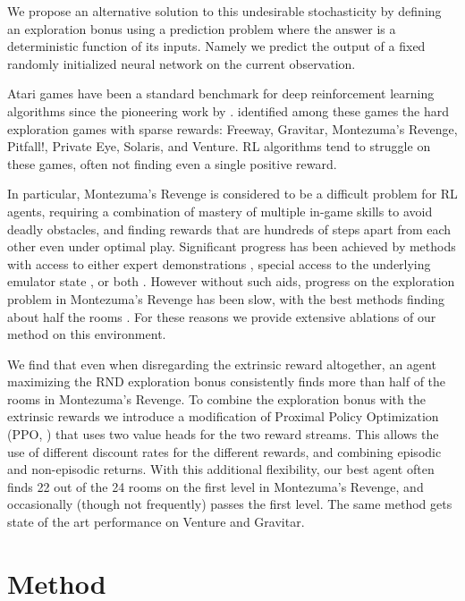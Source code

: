 \documentclass{article} %
\begin{document}
We propose an alternative solution to this undesirable stochasticity by defining an exploration bonus using a prediction problem where the answer is a deterministic function of its inputs. Namely we predict the output of a fixed randomly initialized neural network on the current observation.

Atari games have been a standard benchmark for deep reinforcement learning algorithms since the pioneering work by \cite{mnih2013playing}. \cite{bellemare2016unifying} identified among these games the hard exploration games with sparse rewards: Freeway, Gravitar, Montezuma's Revenge, Pitfall!, Private Eye, Solaris, and Venture. RL algorithms tend to struggle on these games, often not finding even a single positive reward.

In particular, Montezuma's Revenge is considered to be a difficult problem for RL agents, requiring a combination of mastery of multiple in-game skills to avoid deadly obstacles, and finding rewards that are hundreds of steps apart from each other even under optimal play. Significant progress has been achieved by methods with access to either expert demonstrations \citep{pohlen2018observe,aytar2018playing,garmulewicz2018expert}, special access to the underlying emulator state \citep{tang2016exploration,stanton2018deep}, or both \citep{salimans2018mz}. However without such aids, progress on the exploration problem in Montezuma's Revenge has been slow, with the best methods finding about half the rooms \citep{bellemare2016unifying}. For these reasons we provide extensive ablations of our method on this environment.

We find that even when disregarding the extrinsic reward altogether, an agent maximizing the RND exploration bonus consistently finds more than half of the rooms in Montezuma's Revenge. To combine the exploration bonus with the extrinsic rewards we introduce a modification of Proximal Policy Optimization (PPO, \cite{ppo}) that uses two value heads for the two reward streams. This allows the use of different discount rates for the different rewards, and combining episodic and non-episodic returns. With this additional flexibility, our best agent often finds 22 out of the 24 rooms on the first level in Montezuma's Revenge, and occasionally (though not frequently) passes the first level. The same method gets state of the art performance on Venture and Gravitar.
\section{Method}
\end{document}
